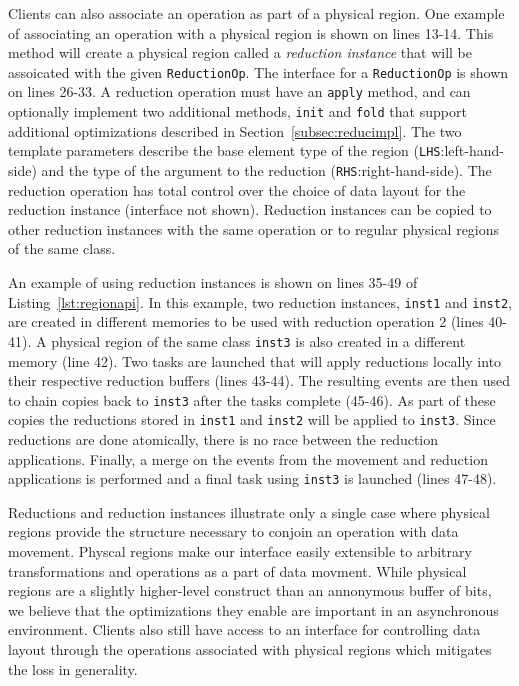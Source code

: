 Clients can also associate an operation as part of a physical region.  One example of
associating an operation with a physical region is shown on lines 13-14.  This method
will create a physical region called a {\em reduction instance} that will be assoicated 
with the given {\tt ReductionOp}.  The interface for a {\tt ReductionOp} is shown on 
lines 26-33.  A reduction operation must have an {\tt apply} method, and can optionally 
implement two additional methods, {\tt init} and {\tt fold} that support additional 
optimizations described in Section~\ref{subsec:reducimpl}.  The two template parameters 
describe the base element type of the region ({\tt LHS}:left-hand-side) and the type of 
the argument to the reduction ({\tt RHS}:right-hand-side).  The reduction operation has 
total control over the choice of data layout for the reduction instance (interface not shown).
Reduction instances can be copied to other reduction instances with the same operation
or to regular physical regions of the same class.

An example of using reduction instances is shown on lines 35-49 of Listing~\ref{lst:regionapi}.
In this example, two reduction instances, {\tt inst1} and {\tt inst2}, are created in different memories to
be used with reduction operation 2 (lines 40-41).  A physical region of the same class {\tt inst3}
is also created in a different memory (line 42).  Two tasks are launched that will apply
reductions locally into their respective reduction buffers (lines 43-44).  The resulting
events are then used to chain copies back to {\tt inst3} after the tasks complete (45-46).  As
part of these copies the reductions stored in {\tt inst1} and {\tt inst2} will be applied
to {\tt inst3}.  Since reductions are done atomically, there is no race between the reduction
applications.  Finally, a merge on the events from the movement and reduction applications is 
performed and a final task using {\tt inst3} is launched (lines 47-48).

Reductions and reduction instances illustrate only a single case where physical regions provide 
the structure necessary to conjoin an operation with data movement.  Physcal regions make our
interface easily extensible to arbitrary transformations and operations as a part of data movment.
While physical regions are a slightly higher-level construct than an annonymous
buffer of bits, we believe that the optimizations they enable are important in an asynchronous
environment.  Clients also still have access to an interface for controlling data layout through
the operations associated with physical regions which mitigates the loss in generality.

